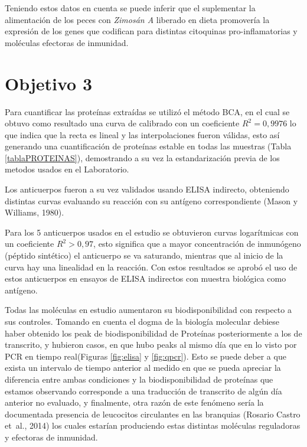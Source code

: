 \documentclass[12pt,letterpaper,oneside]{scrbook}
\begin{document}
Teniendo estos datos en cuenta se puede inferir que el suplementar la
alimentación de los peces con \emph{Zimosán A} liberado en dieta
promovería la expresión de los genes que codifican para distintas
citoquinas pro-inflamatorias y moléculas efectoras de inmunidad.

\section{Objetivo 3}

Para cuantificar las proteínas extraídas se utilizó el método BCA, en el
cual se obtuvo como resultado una curva de calibrado con un coeficiente
\(R^2 = 0,9976\) lo que indica que la recta es lineal y las
interpolaciones fueron válidas, esto así generando una cuantificación de
proteínas estable en todas las muestras (Tabla \ref{tablaPROTEINAS}),
demostrando a su vez la estandarización previa de los metodos usados en
el Laboratorio.

Los anticuerpos fueron a su vez validados usando ELISA indirecto,
obteniendo distintas curvas evaluando su reacción con su antígeno
correspondiente (Mason y Williams, 1980).

Para los 5 anticuerpos usados en el estudio se obtuvieron curvas
logarítmicas con un coeficiente \(R^2 > 0,97\), esto significa que a
mayor concentración de inmunógeno (péptido sintético) el anticuerpo se
va saturando, mientras que al inicio de la curva hay una linealidad en
la reacción. Con estos resultados se aprobó el uso de estos anticuerpos
en ensayos de ELISA indirectos con muestra biológica como antígeno.

Todas las moléculas en estudio aumentaron su biodisponibilidad con
respecto a sus controles. Tomando en cuenta el dogma de la biología
molecular debiese haber obtenido los peak de biodisponibilidad de
Proteínas posteriormente a los de transcrito, y hubieron casos, en que
hubo peaks al mismo día que en lo visto por PCR en tiempo real(Figuras
\ref{fig:elisa} y \ref{fig:qpcr}). Esto se puede deber a que exista un
intervalo de tiempo anterior al medido en que se pueda apreciar la
diferencia entre ambas condiciones y la biodisponibilidad de proteínas
que estamos observando corresponde a una traducción de transcrito de
algún día anterior no evaluado, y finalmente, otra razón de este
fenómeno sería la documentada presencia de leucocitos circulantes en las
branquias (Rosario Castro et~al., 2014) los cuales estarían produciendo
estas distintas moléculas reguladoras y efectoras de inmunidad.
\end{document}
